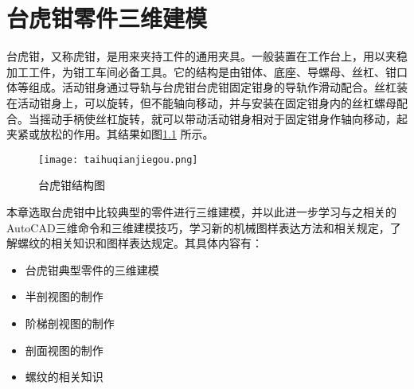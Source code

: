 \chapter{台虎钳零件三维建模}
台虎钳，又称虎钳，是用来夹持工件的通用夹具。一般装置在工作台上，用以夹稳加工工件，为钳工车间必备工具。它的结构是由钳体、底座、导螺母、丝杠、钳口体等组成。活动钳身通过导轨与台虎钳台虎钳固定钳身的导轨作滑动配合。丝杠装在活动钳身上，可以旋转，但不能轴向移动，并与安装在固定钳身内的丝杠螺母配合。当摇动手柄使丝杠旋转，就可以带动活动钳身相对于固定钳身作轴向移动，起夹紧或放松的作用。其结果如图\ref{fig:taihuqianjiegou} 所示。

\begin{figure}[htbp]
\centering
\texttt{[image: taihuqianjiegou.png]}
\caption{台虎钳结构图}\label{fig:taihuqianjiegou}
\end{figure}

本章选取台虎钳中比较典型的零件进行三维建模，并以此进一步学习与之相关的AutoCAD三维命令和三维建模技巧，学习新的机械图样表达方法和相关规定，了解螺纹的相关知识和图样表达规定。其具体内容有：
\begin{itemize}
\item 台虎钳典型零件的三维建模
\item 半剖视图的制作
\item 阶梯剖视图的制作
\item 剖面视图的制作
\item 螺纹的相关知识
\end{itemize}
%
%
%
%
%
%
%

\endinput
